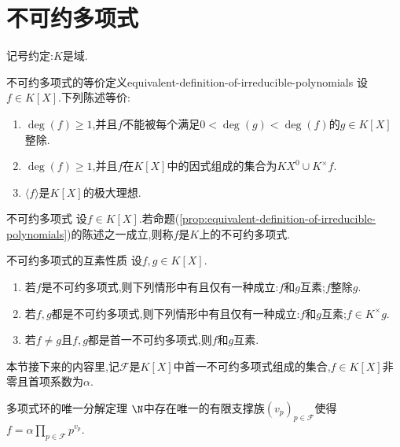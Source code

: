 \section{不可约多项式}

记号约定:$K$是域.

\begin{proposition}{不可约多项式的等价定义}{equivalent-definition-of-irreducible-polynomials}
	设$f\in K\left[X\right]$.下列陈述等价:
	\begin{enumerate}
		\item $\deg\left(f\right)\geq 1$,并且$f$不能被每个满足$0<\deg\left(g\right)<\deg\left(f\right)$的$g\in K\left[X\right]$整除.
		\item $\deg\left(f\right)\geq 1$,并且$f$在$K\left[X\right]$中的因式组成的集合为$KX^{0}\cup K^{\times}f$.
		\item $\langle f\rangle$是$K\left[X\right]$的极大理想.
	\end{enumerate}
\end{proposition}

\begin{definition}{不可约多项式}{}
	设$f\in K\left[X\right]$.若命题(\ref{prop:equivalent-definition-of-irreducible-polynomials})的陈述之一成立,则称$f$是$K$上的不可约多项式.
\end{definition}

\begin{proposition}{不可约多项式的互素性质}{}
	设$f,g\in K\left[X\right]$.
	\begin{enumerate}
		\item 若$f$是不可约多项式,则下列情形中有且仅有一种成立:$f$和$g$互素;$f$整除$g$.
		\item 若$f,g$都是不可约多项式,则下列情形中有且仅有一种成立:$f$和$g$互素;$f\in K^{\times}g$.
		\item 若$f\neq g$且$f,g$都是首一不可约多项式,则$f$和$g$互素.
	\end{enumerate}
\end{proposition}

本节接下来的内容里,记$\mathscr{F}$是$K\left[X\right]$中首一不可约多项式组成的集合,$f\in K\left[X\right]$非零且首项系数为$\alpha$.

\begin{proposition}{多项式环的唯一分解定理}{}
	$\N$中存在唯一的有限支撑族$\left(v_{p}\right)_{p\in\mathscr{F}}$使得$f=\alpha\prod\limits_{p\in\mathscr{F}}p^{v_{p}}$.
\end{proposition}

